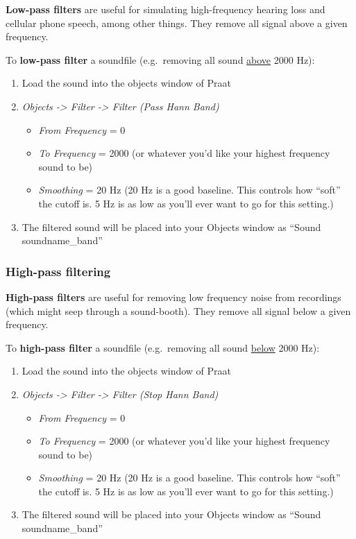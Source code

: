 \textbf{Low-pass filters} are useful for simulating high-frequency
hearing loss and cellular phone speech, among other things. They remove
all signal above a given frequency.

To \textbf{low-pass filter} a soundfile (e.g.~removing all sound
\underline{above} 2000 Hz):

\begin{enumerate}
\def\labelenumi{\arabic{enumi}.}
\tightlist
\item
  Load the sound into the objects window of Praat
\item
  \emph{Objects -\textgreater{} Filter -\textgreater{} Filter (Pass Hann
  Band)}

  \begin{itemize}
  \tightlist
  \item
    \emph{From Frequency} = 0
  \item
    \emph{To Frequency} = 2000 (or whatever you'd like your highest
    frequency sound to be)
  \item
    \emph{Smoothing} = 20 Hz (20 Hz is a good baseline. This controls
    how ``soft'' the cutoff is. 5 Hz is as low as you'll ever want to go
    for this setting.)
  \end{itemize}
\item
  The filtered sound will be placed into your Objects window as ``Sound
  soundname\_band''
\end{enumerate}

\hypertarget{high-pass-filtering}{%
\subsubsection{High-pass filtering}\label{high-pass-filtering}}

\textbf{High-pass filters} are useful for removing low frequency noise
from recordings (which might seep through a sound-booth). They remove
all signal below a given frequency.

To \textbf{high-pass filter} a soundfile (e.g.~removing all sound
\underline{below} 2000 Hz):

\begin{enumerate}
\def\labelenumi{\arabic{enumi}.}
\tightlist
\item
  Load the sound into the objects window of Praat
\item
  \emph{Objects -\textgreater{} Filter -\textgreater{} Filter (Stop Hann
  Band)}

  \begin{itemize}
  \tightlist
  \item
    \emph{From Frequency} = 0
  \item
    \emph{To Frequency} = 2000 (or whatever you'd like your highest
    frequency sound to be)
  \item
    \emph{Smoothing} = 20 Hz (20 Hz is a good baseline. This controls
    how ``soft'' the cutoff is. 5 Hz is as low as you'll ever want to go
    for this setting.)
  \end{itemize}
\item
  The filtered sound will be placed into your Objects window as ``Sound
  soundname\_band''
\end{enumerate}

